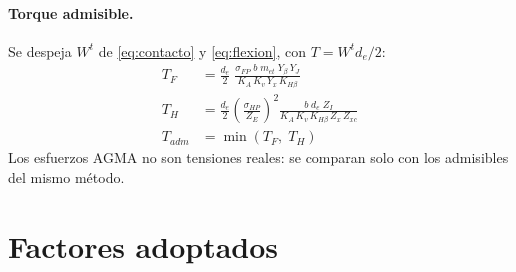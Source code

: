 \documentclass[11pt,a4paper]{article}
\begin{document}
\paragraph{Torque admisible.} Se despeja $W^t$ de \eqref{eq:contacto} y \eqref{eq:flexion}, con $T=W^t d_e/2$:
\begin{align}
T_F &= \frac{d_e}{2}\;\frac{\sigma_{FP}\;b\;m_{et}\;Y_\beta\,Y_J}{K_A\,K_v\,Y_x\,K_{H\beta}}\\[4pt]
T_H &= \frac{d_e}{2}\left(\frac{\sigma_{HP}}{Z_E}\right)^{2}\frac{b\;d_e\;Z_I}{K_A\,K_v\,K_{H\beta}\,Z_x\,Z_{xc}}\\[4pt]
T_{adm} &= \min\left(T_F,\;T_H\right)
\end{align}
Los esfuerzos AGMA no son tensiones reales: se comparan solo con los admisibles del mismo método.

\section{Factores adoptados}
\end{document}
